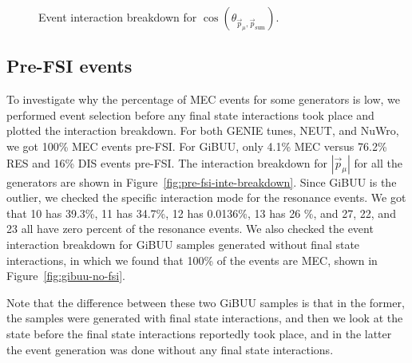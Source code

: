 \documentclass{article}
\newcommand{\vm}{\vec{p}_\mu}
\newcommand{\vtp}{\vec{p}_{\text{sum}}}
\begin{document}
\begin{figure}
    \caption{Event interaction breakdown for $\cos(\theta_{\vm,\vtp})$.}
    \label{fig:inte-breakdown-cos-opening-angle-muon-total-proton}
\end{figure}

\clearpage

\subsection{Pre-FSI events}

To investigate why the percentage of MEC events for some generators is low, we performed event selection before any final state interactions took place and plotted the interaction breakdown. 
For both GENIE tunes, NEUT, and NuWro, we got 100\% MEC events pre-FSI. For GiBUU, only 4.1\% MEC versus 76.2\% RES and 16\% DIS events pre-FSI. 
The interaction breakdown for $|\vm|$ for all the generators are shown in Figure~\ref{fig:pre-fsi-inte-breakdown}. 
Since GiBUU is the outlier, we checked the specific interaction mode for the resonance events. We got that 10 has 39.3\%, 11 has 34.7\%, 12 has 0.0136\%, 13 has 26 \%, and 27, 22, and 23 all have zero percent of the resonance events. 
We also checked the event interaction breakdown for GiBUU samples generated without final state interactions, in which we found that 100\% of the events are MEC, shown in Figure~\ref{fig:gibuu-no-fsi}.

Note that the difference between these two GiBUU samples is that in the former, the samples were generated with final state interactions, and then we look at the state before the final state interactions reportedly took place, 
and in the latter the event generation was done without any final state interactions.
\end{document}
